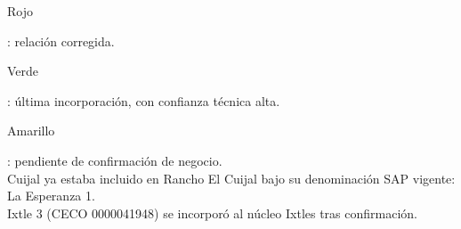 \documentclass[11pt]{article}
\newcommand{\corregido}[1]{\colorbox{red!25}{\strut #1}}
\newcommand{\incorporado}[1]{\colorbox{green!25}{\strut #1}}
\newcommand{\pendiente}[1]{\colorbox{yellow!35}{\strut #1}}
\begin{document}
\noindent\corregido{Rojo}: relación corregida.\\
\incorporado{Verde}: última incorporación, con confianza técnica alta.\\
\pendiente{Amarillo}: pendiente de confirmación de negocio.\\
Cuijal ya estaba incluido en Rancho El Cuijal bajo su denominación SAP vigente: La Esperanza 1.\\
Ixtle 3 (CECO 0000041948) se incorporó al núcleo Ixtles tras confirmación.
\end{document}
